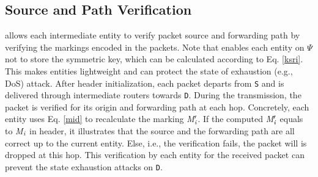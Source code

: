 \subsection{Source and Path Verification}
\label{sourceandpathverification}
\name{} allows each intermediate entity to verify packet source and forwarding path by verifying the markings encoded in the packets. Note that \name{} enables each entity on $\Psi$ not to store the symmetric key, which can be calculated according to Eq. \ref{ksri}. This makes entities lightweight and can protect the state of exhaustion (e.g., DoS) attack. After \name{} header initialization, each packet departs from {\tt S} and is delivered through intermediate routers towards {\tt D}. During the transmission, the packet is verified for its origin and forwarding path at each hop.
Concretely, each entity uses Eq. \ref{mid} to recalculate the marking \emph{M}$_\emph{i}'$. If the computed \emph{M}$_\emph{i}'$ equals to \emph{M}$_\emph{i}$ in \name{} header, it illustrates that the source and the forwarding path are all correct up to the current entity. Else, i.e., the verification fails, the packet will is dropped at this hop. This verification by each entity for the received packet can prevent the state exhaustion attacks on {\tt D}. 